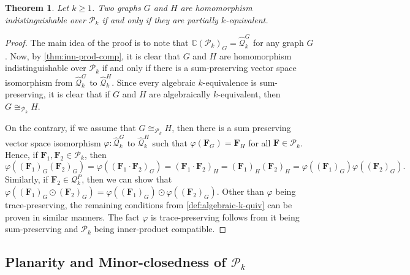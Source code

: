 \documentclass[11pt,a4paper]{article}
\theoremstyle{plain}
\newtheorem{thm}{Theorem}[section]
\theoremstyle{remark}
\theoremstyle{definition}
\def\calP{{\mathcal P}} \def\calQ{{\mathcal Q}} \def\calR{{\mathcal R}}
\begin{document}
\begin{thm}\label{thm:main-theorem-3}
  Let $k\geq 1$. 
  Two graphs $G$ and $H$ are homomorphism indistinguishable over $\calP_k$ if and only if they are partially $k$-equivalent.
\end{thm}
\begin{proof}
The main idea of the proof is to note that $\mathbb{C}(\calP_k)_G = \hat{\calQ}_k^G$ for any graph $G$. Now, by \cref{thm:inn-prod-comp}, it is clear that $G$ and $H$ are homomorphism indistinguishable over $\calP_k$ if and only if there is a sum-preserving vector space isomorphism from $ \hat{\calQ}_k^G$ to $ \hat{\calQ}_k^H$. Since every algebraic $k$-equivalence is sum-preserving, it is clear that if $G$ and $H$ are algebraically $k$-equivalent, then $G \cong_{\calP_k} H$. 

On the contrary, if we assume that $G \cong_{\calP_k} H$, then there is a sum preserving vector space isomorphism $\varphi\colon \hat{\calQ}_k^G$ to $ \hat{\calQ}_k^H$ such that $\varphi(\boldsymbol{F}_G) = \boldsymbol{F}_H$ for all $\boldsymbol{F} \in \calP_k$. Hence, if $\boldsymbol{F}_1, \boldsymbol{F}_2 \in \calP_k$, then
\[\varphi((\boldsymbol{F}_1)_G(\boldsymbol{F}_2)_G) = \varphi((\boldsymbol{F}_1 \cdot \boldsymbol{F}_2)_G) = (\boldsymbol{F}_1 \cdot \boldsymbol{F}_2)_H = (\boldsymbol{F}_1)_H(\boldsymbol{F}_2)_H = \varphi((\boldsymbol{F}_1)_G) \varphi((\boldsymbol{F}_2)_G).\]
Similarly, if $\boldsymbol{F}_2 \in \calQ_k^P$, then we can show that $\varphi((\boldsymbol{F}_1)_G \odot (\boldsymbol{F}_2)_G) = \varphi((\boldsymbol{F}_1)_G) \odot \varphi((\boldsymbol{F}_2)_G)$. Other than $\varphi$ being trace-preserving, the remaining conditions from \cref{def:algebraic-k-quiv} can be proven in similar manners. The fact $\varphi$ is trace-preserving follows from it being sum-preserving and $\calP_k$ being inner-product compatible.

\end{proof}


\subsection{Planarity and Minor-closedness of $\calP_k$}\label{sub-sec:graph-class}
\end{document}
